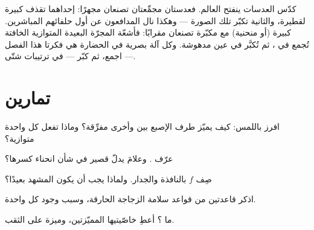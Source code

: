 \begin{remark}\label{rem:g8:lenses-images:instruments}
كدّس العدسات ينفتح العالم. فعدستان مجمِّعتان تصنعان مجهرًا:
إحداهما تقذف  كبيرة لقطيرة، والثانية تكبّر تلك
الصورة --- وهكذا نال المدافعون عن  أول حلفائهم
المباشرين.  كبيرة (أو  منحنية) مع مكبّرة تصنعان
مقرابًا: فأشعّة المجرّة البعيدة المتوازية الخافتة تُجمع في ، ثم تُكبَّر في عين مدهوشة. وكل آلة بصرية في الحضارة هي
فكرتا هذا الفصل --- اجمع، ثم كبّر --- في ترتيبات شتّى.
\end{remark}

\section{تمارين}

\begin{exercise}[$\star$]\label{exo:g8:lenses-images:1}
افرز باللمس: كيف يميّز طرف الإصبع بين  وأخرى
مفرِّقة؟ وماذا تفعل كل واحدة  متوازية؟
\end{exercise}

\begin{exercise}[$\star$]\label{exo:g8:lenses-images:2}
عرّف  . وعلامَ يدلّ  قصير في شأن
انحناء   كسرها؟
\end{exercise}

\begin{exercise}[$\star$]\label{exo:g8:lenses-images:3}
صِف  $f$ بالنافذة والجدار. ولماذا يجب أن يكون المشهد
بعيدًا؟
\end{exercise}

\begin{exercise}[$\star$]\label{exo:g8:lenses-images:4}
اذكر قاعدتين من قواعد سلامة الزجاجة الحارقة، وسبب وجود كل
واحدة.
\end{exercise}

\begin{exercise}[$\star$]\label{exo:g8:lenses-images:5}
ما ؟ أعطِ خاصّيتيها المميّزتين، وميزة 
على الثقب.
\end{exercise}

